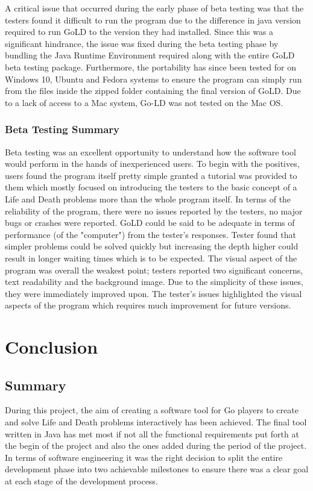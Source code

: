 \documentclass{l4proj}
\begin{document}
A critical issue that occurred during the early phase of beta testing was that the testers found it difficult to run the program due to the difference in java version required to run GoLD to the version they had installed. Since this was a significant hindrance, the issue was fixed during the beta testing phase by bundling the Java Runtime Environment required along with the entire GoLD beta testing package. Furthermore, the portability has since been tested for on Windows 10, Ubuntu and  Fedora systems to ensure the program can simply run from the files inside the zipped folder containing the final version of GoLD. Due to a lack of access to a Mac system, Go-LD was not tested on the Mac OS.

\subsection{Beta Testing Summary}
Beta testing was an excellent opportunity to understand how the software tool would perform in the hands of inexperienced users. To begin with the positives, users found the program itself pretty simple granted a tutorial was provided to them which mostly focused on introducing the testers to the basic concept of a Life and Death problems more than the whole program itself. In terms of the reliability of the program, there were no issues reported by the testers, no major bugs or crashes were reported. GoLD could be said to be adequate in terms of performance (of the "computer") from the tester’s responses. Tester found that simpler problems could be solved quickly but increasing the depth higher could result in longer waiting times which is to be expected. The visual aspect of the program was overall the weakest point; testers reported two significant concerns, text readability and the background image. Due to the simplicity of these issues, they were immediately improved upon. The tester’s issues highlighted the visual aspects of the program which requires much improvement for future versions.





\chapter{Conclusion}

\section{Summary}
During this project, the aim of creating a software tool for Go players to create and solve Life and Death problems interactively has been achieved. The final tool written in Java has met most if not all the functional requirements put forth at the begin of the project and also the ones added during the period of the project. In terms of software engineering it was the right decision to split the entire development phase into two achievable milestones to ensure there was a clear goal at each stage of the development process.
\end{document}
